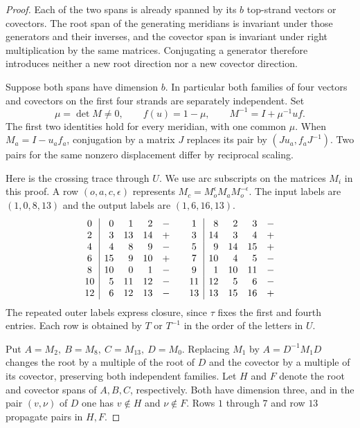 \begin{proof}
Each of the two spans is already spanned by its \(b\) top-strand
vectors or covectors. The root span of the generating meridians is
invariant under those generators and their inverses, and the
covector span is invariant under right multiplication by the same
matrices. Conjugating a generator therefore introduces neither a
new root direction nor a new covector direction.

Suppose both spans have dimension \(b\). In particular both
families of four vectors and covectors on the first four strands
are separately independent. Set
\[
 \mu=\det M\ne0,\qquad f(u)=1-\mu,\qquad
 M^{-1}=I+\mu^{-1}u f.
\]
The first two identities hold for every meridian, with one common
\(\mu\). When \(M_a=I-u_a f_a\), conjugation by a matrix \(J\)
replaces its pair by \((Ju_a,f_aJ^{-1})\). Two pairs for the same
nonzero displacement differ by reciprocal scaling.

Here is the crossing trace through \(U\). We use arc subscripts on
the matrices \(M_i\) in this proof. A row \((o,a,c,\epsilon)\)
represents \(M_c=M_o^\epsilon M_aM_o^{-\epsilon}\).
The input labels are \((1,0,8,13)\) and the output labels are
\((1,6,16,13)\).
\begin{equation}\label{eq:prefix}
\begin{array}{c|rrrr@{\qquad}c|rrrr}
0&0&1&2&-&1&8&2&3&-\\
2&3&13&14&+&3&14&3&4&+\\
4&4&8&9&-&5&9&14&15&+\\
6&15&9&10&+&7&10&4&5&-\\
8&10&0&1&-&9&1&10&11&-\\
10&5&11&12&-&11&12&5&6&-\\
12&6&12&13&-&13&13&15&16&+
\end{array}
\end{equation}
The repeated outer labels express closure, since \(\tau\) fixes
the first and fourth entries. Each row is obtained by \(T\) or
\(T^{-1}\) in the order of the letters in \(U\).

Put \(A=M_2,\ B=M_8,\ C=M_{13},\ D=M_0\).
Replacing \(M_1\) by \(A=D^{-1}M_1D\) changes the root by a
multiple of the root of \(D\) and the covector by a multiple of
its covector, preserving both independent families.
Let \(H\) and \(F\) denote the root and covector spans of
\(A,B,C\), respectively. Both have dimension three, and in the
pair \((v,\nu)\) of \(D\) one has \(v\notin H\) and \(\nu\notin F\).
Rows \(1\) through \(7\) and row \(13\) propagate pairs in \(H,F\).


\end{proof}

